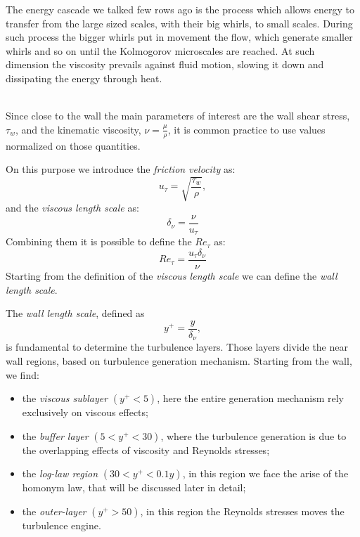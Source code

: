 The energy cascade we talked few rows ago is the process which allows energy to transfer from the large sized scales, with their big whirls, to small scales. During such process the bigger whirls put in movement the flow, which generate smaller whirls and so on until the Kolmogorov microscales are reached. At such dimension the viscosity prevails against fluid motion, slowing it down and dissipating the energy through heat. \\~\par

Since close to the wall the main parameters of interest are the wall shear stress, $\tau_{w}$, and the kinematic viscosity, $\nu=\frac{\mu}{\rho}$, it is common practice to use values normalized on those quantities.\par
On this purpose we introduce the \emph{friction velocity} as:
\begin{equation*}
u_{\tau} = \sqrt{\frac{\tau_{w}}{\rho}},
\end{equation*}
and the \emph{viscous length scale} as:
\begin{equation*}
\delta_{\nu} = \frac{\nu}{u_{\tau}}
\end{equation*}
Combining them it is possible to define the $Re_{\tau}$ as:
\begin{equation*}
Re_{\tau} = \frac{u_{\tau}\delta_{\nu}}{\nu}
\end{equation*}
Starting from the definition of the \emph{viscous length scale} we can define the \emph{wall length scale}. \par
The \emph{wall length scale}, defined as
\begin{equation*}
y^{+} = \frac{y}{\delta_{\nu}},
\end{equation*}
is fundamental to determine the turbulence layers. Those layers divide the near wall regions, based on turbulence generation mechanism.
Starting from the wall, we find:
\begin{itemize}
\item the \emph{viscous sublayer} $(y^{+}<5)$, here the entire generation mechanism rely exclusively on viscous effects;
\item the \emph{buffer layer} $(5<y^{+}<30)$, where the turbulence generation is due to the overlapping effects of viscosity and Reynolds stresses;
\item the \emph{log-law region} $(30<y^{+}<0.1y)$, in this region we face the arise of the homonym law, that will be discussed later in detail;
\item the \emph{outer-layer} $(y^{+}>50)$, in this region the Reynolds stresses moves the turbulence engine.
\end{itemize}
